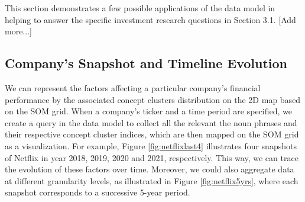 This section demonstrates a few possible applications of the data model in helping to answer the specific investment research questions in Section 3.1. [Add more...]

\subsection{Company's Snapshot and Timeline Evolution}

We can represent the factors affecting a particular company's financial performance by the associated concept clusters distribution on the 2D map based on the SOM grid. When a company's ticker and a time period are specified, we create a query in the data model to collect all the relevant the noun phrases and their respective concept cluster indices, which are then mapped on the SOM grid as a visualization. For example, Figure \ref{fig:netflixlast4} illustrates four snapshots of Netflix in year 2018, 2019, 2020 and 2021, respectively. This way, we can trace the evolution of these factors over time. Moreover, we could also aggregate data at different granularity levels, as illustrated in Figure \ref{fig:netflix5yrs}, where each snapshot corresponds to a successive 5-year period. 

